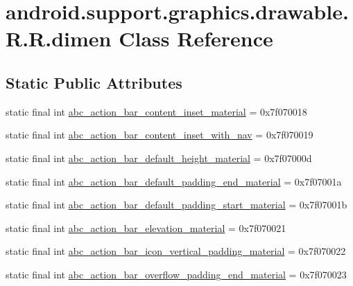 \hypertarget{classandroid_1_1support_1_1graphics_1_1drawable_1_1_r_1_1dimen}{
\section{android.support.graphics.drawable.R.R.dimen Class Reference}
\label{classandroid_1_1support_1_1graphics_1_1drawable_1_1_r_1_1dimen}
}
\subsection*{Static Public Attributes}
\begin{CompactItemize}
\item 
static final int \hyperlink{classandroid_1_1support_1_1graphics_1_1drawable_1_1_r_1_1dimen_dd8a435dc6190ff33a65102f0b67b721}{abc\_\-action\_\-bar\_\-content\_\-inset\_\-material} = 0x7f070018
\item 
static final int \hyperlink{classandroid_1_1support_1_1graphics_1_1drawable_1_1_r_1_1dimen_616231692289951699169c42bf635ce7}{abc\_\-action\_\-bar\_\-content\_\-inset\_\-with\_\-nav} = 0x7f070019
\item 
static final int \hyperlink{classandroid_1_1support_1_1graphics_1_1drawable_1_1_r_1_1dimen_6ff193be72a7072b7bf37e5480c91fd8}{abc\_\-action\_\-bar\_\-default\_\-height\_\-material} = 0x7f07000d
\item 
static final int \hyperlink{classandroid_1_1support_1_1graphics_1_1drawable_1_1_r_1_1dimen_2e1f5733111b14ee678edafc4a849a3f}{abc\_\-action\_\-bar\_\-default\_\-padding\_\-end\_\-material} = 0x7f07001a
\item 
static final int \hyperlink{classandroid_1_1support_1_1graphics_1_1drawable_1_1_r_1_1dimen_3f334007bbe4872e09e2a730a3945672}{abc\_\-action\_\-bar\_\-default\_\-padding\_\-start\_\-material} = 0x7f07001b
\item 
static final int \hyperlink{classandroid_1_1support_1_1graphics_1_1drawable_1_1_r_1_1dimen_c27f7dd06d591236d2225346ee1c90bf}{abc\_\-action\_\-bar\_\-elevation\_\-material} = 0x7f070021
\item 
static final int \hyperlink{classandroid_1_1support_1_1graphics_1_1drawable_1_1_r_1_1dimen_8b4cb880f784bb9a24f6701fbfcc0f0c}{abc\_\-action\_\-bar\_\-icon\_\-vertical\_\-padding\_\-material} = 0x7f070022
\item 
static final int \hyperlink{classandroid_1_1support_1_1graphics_1_1drawable_1_1_r_1_1dimen_b5b1dd06494a28a5ab604b85a18f2d3b}{abc\_\-action\_\-bar\_\-overflow\_\-padding\_\-end\_\-material} = 0x7f070023

\end{CompactItemize}
